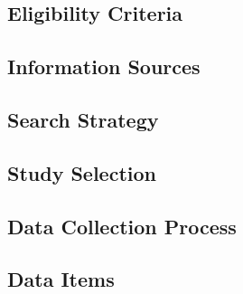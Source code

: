 
\subsection{Eligibility Criteria}\label{sec:eligibility}


\subsection{Information Sources}\label{sec:sources}


\subsection{Search Strategy}\label{sec:search}


\subsection{Study Selection}\label{sec:selection}


\subsection{Data Collection Process}\label{sec:data-collection}


\subsection{Data Items}\label{sec:data-items}

